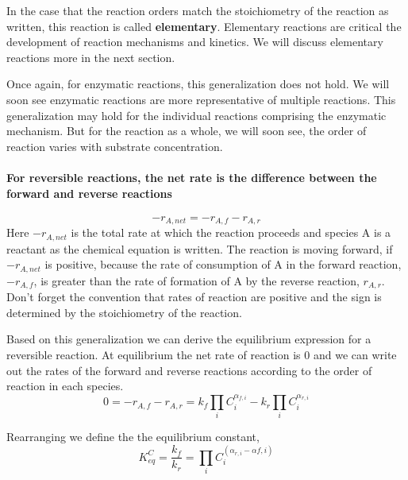 \documentclass[
]{article}
\begin{document}
In the case that the reaction orders match the stoichiometry of the reaction as written, this reaction is called \textbf{elementary}. Elementary reactions are critical the development of reaction mechanisms and kinetics. We will discuss elementary reactions more in the next section.

Once again, for enzymatic reactions, this generalization does not hold. We will soon see enzymatic reactions are more representative of multiple reactions. This generalization may hold for the individual reactions comprising the enzymatic mechanism. But for the reaction as a whole, we will soon see, the order of reaction varies with substrate concentration.

\hypertarget{for-reversible-reactions-the-net-rate-is-the-difference-between-the-forward-and-reverse-reactions}{%
\paragraph{For reversible reactions, the net rate is the difference between the forward and reverse reactions}\label{for-reversible-reactions-the-net-rate-is-the-difference-between-the-forward-and-reverse-reactions}}

\[-r_{A,net} = -r_{A,f}-r_{A,r}\]
Here \(-r_{A,net}\) is the total rate at which the reaction proceeds and species A is a reactant as the chemical equation is written. The reaction is moving forward, if \(-r_{A,net}\) is positive, because the rate of consumption of A in the forward reaction, \(-r_{A,f}\), is greater than the rate of formation of A by the reverse reaction, \(r_{A,r}\). Don't forget the convention that rates of reaction are positive and the sign is determined by the stoichiometry of the reaction.

Based on this generalization we can derive the equilibrium expression for a reversible reaction. At equilibrium the net rate of reaction is 0 and we can write out the rates of the forward and reverse reactions according to the order of reaction in each species.
\[0 = -r_{A,f} - r_{A,r} = k_f \prod_i C_i^{\alpha_{f,i}} - k_r \prod_i C_i^{\alpha_{r,i}}\]

Rearranging we define the the equilibrium constant,
\[ K_{eq}^C = \frac{k_f}{k_r} = \prod_i C_i^{(\alpha_{r,i} - \alpha{f,i})}\]
\end{document}
